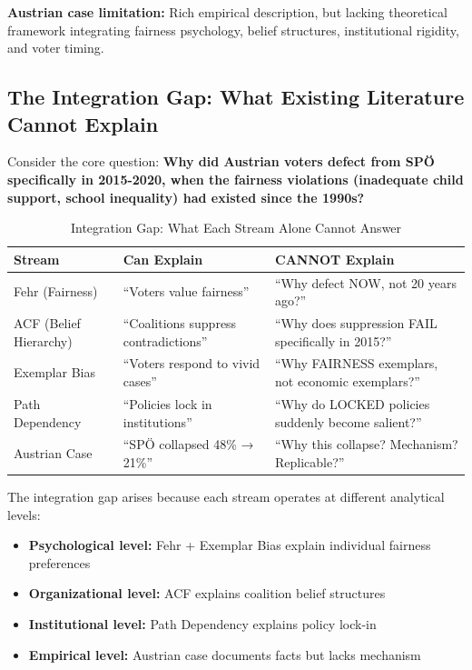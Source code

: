 \textbf{Austrian case limitation:} Rich empirical description, but lacking theoretical framework
integrating fairness psychology, belief structures, institutional rigidity, and voter timing.

\subsection{The Integration Gap: What Existing Literature Cannot Explain}

Consider the core question: \textbf{Why did Austrian voters defect from SPÖ specifically in 2015-2020,
when the fairness violations (inadequate child support, school inequality) had existed since the 1990s?}

\begin{table}[htbp]
\centering
\caption{Integration Gap: What Each Stream Alone Cannot Answer}
\label{tab:cm-integration-gap}
\renewcommand{\arraystretch}{1.3}
\begin{tabular}{@{}lll@{}}
\toprule
\textbf{Stream} & \textbf{Can Explain} & \textbf{CANNOT Explain} \\
\midrule
Fehr (Fairness) & ``Voters value fairness'' & ``Why defect NOW, not 20 years ago?'' \\
ACF (Belief Hierarchy) & ``Coalitions suppress contradictions'' & ``Why does suppression FAIL specifically in 2015?'' \\
Exemplar Bias & ``Voters respond to vivid cases'' & ``Why FAIRNESS exemplars, not economic exemplars?'' \\
Path Dependency & ``Policies lock in institutions'' & ``Why do LOCKED policies suddenly become salient?'' \\
Austrian Case & ``SPÖ collapsed 48\% → 21\%'' & ``Why this collapse? Mechanism? Replicable?'' \\
\bottomrule
\end{tabular}
\end{table}

The integration gap arises because each stream operates at different analytical levels:

\begin{itemize}[nosep]
\item \textbf{Psychological level:} Fehr + Exemplar Bias explain individual fairness preferences
\item \textbf{Organizational level:} ACF explains coalition belief structures
\item \textbf{Institutional level:} Path Dependency explains policy lock-in
\item \textbf{Empirical level:} Austrian case documents facts but lacks mechanism
\end{itemize}

